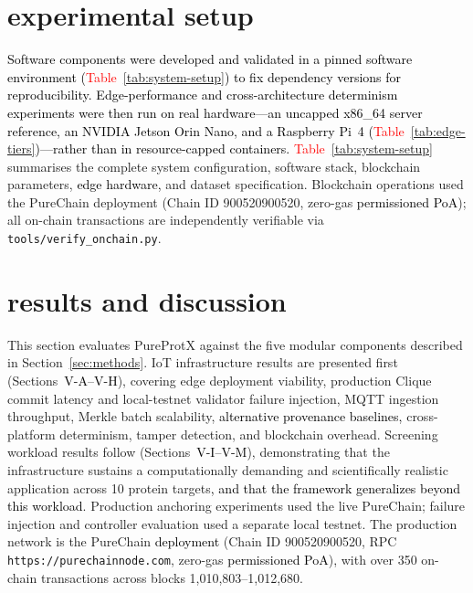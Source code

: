 \documentclass[conference]{IEEEtran}
\newcommand{\rev}[2]{#2}
\begin{document}
\begin{table}[!htbp]
{\begin{tabular}{p{2.6cm} p{2.8cm} p{4.5cm}}
\bottomrule
\end{tabular}}
\end{table}
\section{\textbf{experimental setup}}
\label{sec:experiments}
\textcolor{black}{Software components were developed and validated in a pinned
software environment (\textcolor{red}{Table~\ref{tab:system-setup}}) to fix dependency versions for reproducibility.
Edge-performance and cross-architecture determinism experiments were then run
on real hardware---an uncapped x86\_64 server reference, an NVIDIA Jetson
Orin Nano, and a Raspberry Pi~4 (\textcolor{red}{Table~\ref{tab:edge-tiers}})---rather than in resource-capped
containers.} \textcolor{red}{Table~\ref{tab:system-setup}} summarises the complete system configuration, software
stack, blockchain parameters, \textcolor{black}{edge hardware,} and dataset
specification. Blockchain operations used the PureChain
deployment (Chain ID 900520900520, zero-gas \textcolor{black}{permissioned
PoA}); all on-chain transactions are independently verifiable via
\texttt{tools/verify\_onchain.py}.

\section{\textbf{results and discussion}}
\label{sec:results}

This section evaluates PureProtX against the five modular
components described in Section~\ref{sec:methods}.
IoT infrastructure results are presented first
(Sections~\textcolor{black}{V-A–V-H}), covering edge deployment viability,
\rev{R2.4}{production Clique commit latency and local-testnet validator failure injection}, MQTT
ingestion throughput, Merkle batch scalability, \textcolor{black}{alternative
provenance baselines,} cross-platform determinism, tamper detection, and
blockchain overhead. Screening workload results follow
(Sections~\textcolor{black}{V-I–V-M}), demonstrating that the infrastructure
sustains a computationally demanding and scientifically realistic application
across 10 protein targets\textcolor{black}{, and that the framework
generalizes beyond this workload}.
\rev{R1.3}{Production anchoring experiments used the live PureChain; failure injection and controller evaluation used a separate local testnet. The production network is the PureChain}
\textcolor{black}{deployment} (Chain ID 900520900520, RPC
\texttt{https://purechainnode.com}, zero-gas
\textcolor{black}{permissioned PoA}), with over 350 on-chain transactions
across blocks 1,010,803–1,012,680.
\end{document}
